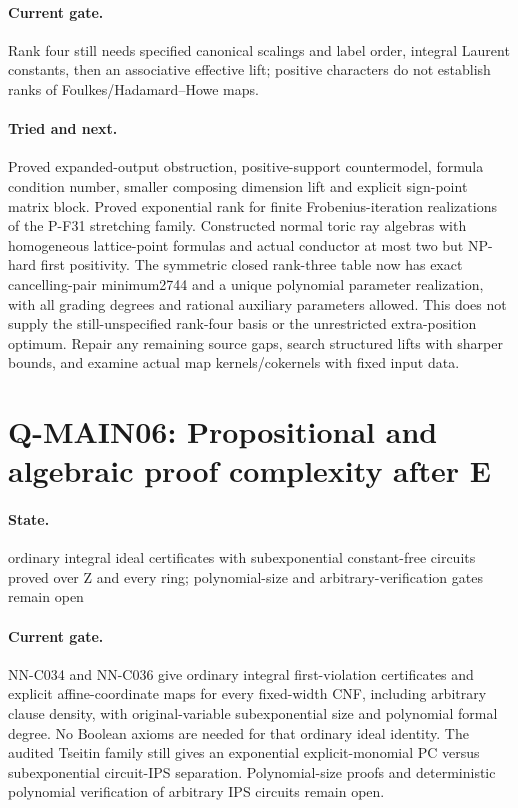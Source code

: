 \paragraph{Current gate.} Rank four still needs specified canonical scalings and label order, integral Laurent constants, then an associative effective lift; positive characters do not establish ranks of Foulkes/Hadamard--Howe maps.
\paragraph{Tried and next.} Proved expanded-output obstruction, positive-support countermodel, formula condition number, smaller composing dimension lift and explicit sign-point matrix block. Proved exponential rank for finite Frobenius-iteration realizations of the P-F31 stretching family. Constructed normal toric ray algebras with homogeneous lattice-point formulas and actual conductor at most two but NP-hard first positivity. The symmetric closed rank-three table now has exact cancelling-pair minimum2744 and a unique polynomial parameter realization, with all grading degrees and rational auxiliary parameters allowed. This does not supply the still-unspecified rank-four basis or the unrestricted extra-position optimum. Repair any remaining source gaps, search structured lifts with sharper bounds, and examine actual map kernels/cokernels with fixed input data.

\section{Q-MAIN06: Propositional and algebraic proof complexity after E}
\paragraph{State.} ordinary integral ideal certificates with subexponential constant-free circuits proved over Z and every ring; polynomial-size and arbitrary-verification gates remain open
\paragraph{Current gate.} NN-C034 and NN-C036 give ordinary integral first-violation certificates and explicit affine-coordinate maps for every fixed-width CNF, including arbitrary clause density, with original-variable subexponential size and polynomial formal degree. No Boolean axioms are needed for that ordinary ideal identity. The audited Tseitin family still gives an exponential explicit-monomial PC versus subexponential circuit-IPS separation. Polynomial-size proofs and deterministic polynomial verification of arbitrary IPS circuits remain open.
